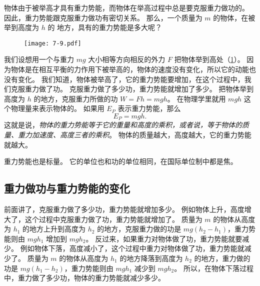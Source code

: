 物体由于被举高才具有重力势能，而物体在举高过程中总是要克服重力做功的。
因此，重力势能跟克服重力做功有密切关系。
那么，一个质量为 $m$ 的物体，在被举到高度为 $h$ 的 地方，具有的重力势能是多大呢？

\begin{figure}
  \texttt{[image: 7-9.pdf]}
  \caption{}\label{fig:7-9}
\end{figure}

我们设想用一个与重力 $mg$ 大小相等方向相反的外力 $F$ 把物体举到高处（\cref{fig:7-9}）。
因为物体是在相互平衡的力作用下被举高的，物体的速度没有变化，所以它的动能也没有变化。
我们知道，物体被举高了，它的重力势能要增加，在这个过程中，我们克服重力做了功。
克服重力做了多少功，重力势能就增加了多少。
把物体举到高度为 $h$ 的地方，克服重力所做的功 $W=Fh=mgh$。
在物理学里就用 $mgh$ 这个物理量来表示物体的。
如果用 $E_P$ 表示重力势能，那么
\[E_P =mgh.\]
这就是说，\emph{物体的重力势能等于它的重量和高度的乘积，或者说，等于物体的质量、重力加速度、高度三者的乘积}。
物体的质量越大，高度越大，它的重力势能就越大。

重力势能也是标量。
它的单位也和功的单位相同，在国际单位制中都是焦。

\subsection{重力做功与重力势能的变化}
前面讲了，克服重力做了多少功，重力势能就增加多少。
例如物体上升，高度增大了，这个过程中克服重力做了功，重力势能就增加了。
质量为 $m$ 的物体从高度为 $h_1$ 的地方上升到高度为 $h_2$ 的地方，克服重力做的功是 $mg(h_2-h_1)$，重力势能则由 $mgh_1$ 增加到 $mgh_2$。
反过来，如果重力对物体做了功，重力势能就要减少。
例如物体下落，高度减小了，这个过程中重力对物体做了功，重力势能就减少了。
质量为 $m$ 的物体从高度为 $h_1$ 的地方降落到高度为 $h_2$ 的地方，重力做的功是 $mg(h_1-h_2)$，重力势能则由 $mgh_1$ 减少到 $mgh_2$。
所以，在物体下落过程中，重力做了多少功，物体的重力势能就减少多少。

